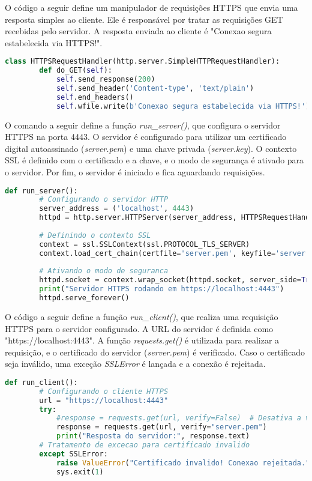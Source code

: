 \documentclass[a4paper,12pt]{article}
\begin{document}
O código a seguir define um manipulador de requisições HTTPS que envia uma resposta simples ao cliente. Ele é responsável por tratar as requisições GET recebidas pelo servidor. A resposta enviada ao cliente é "Conexao segura estabelecida via HTTPS!". 
\begin{lstlisting}[language=Python]
    class HTTPSRequestHandler(http.server.SimpleHTTPRequestHandler):
        def do_GET(self):
            self.send_response(200)
            self.send_header('Content-type', 'text/plain')
            self.end_headers()
            self.wfile.write(b'Conexao segura estabelecida via HTTPS!')
\end{lstlisting}

O comando a seguir define a função \textit{run\_server()}, que configura o servidor HTTPS na porta 4443. O servidor é configurado para utilizar um certificado digital autoassinado (\textit{server.pem}) e uma chave privada (\textit{server.key}). O contexto SSL é definido com o certificado e a chave, e o modo de segurança é ativado para o servidor. Por fim, o servidor é iniciado e fica aguardando requisições.
\begin{lstlisting}[language=Python]
    def run_server():
        # Configurando o servidor HTTP
        server_address = ('localhost', 4443)
        httpd = http.server.HTTPServer(server_address, HTTPSRequestHandler)
        
        # Definindo o contexto SSL
        context = ssl.SSLContext(ssl.PROTOCOL_TLS_SERVER)
        context.load_cert_chain(certfile='server.pem', keyfile='server.key')
    
        # Ativando o modo de seguranca
        httpd.socket = context.wrap_socket(httpd.socket, server_side=True)
        print("Servidor HTTPS rodando em https://localhost:4443")
        httpd.serve_forever()
\end{lstlisting}

O código a seguir define a função \textit{run\_client()}, que realiza uma requisição HTTPS para o servidor configurado. A URL do servidor é definida como "https://localhost:4443". A função \textit{requests.get()} é utilizada para realizar a requisição, e o certificado do servidor (\textit{server.pem}) é verificado. Caso o certificado seja inválido, uma exceção \textit{SSLError} é lançada e a conexão é rejeitada.
\begin{lstlisting}[language=Python]
    def run_client():
        # Configurando o cliente HTTPS
        url = "https://localhost:4443"
        try:
            #response = requests.get(url, verify=False)  # Desativa a verificacao SSL (somente para testes!)
            response = requests.get(url, verify="server.pem")
            print("Resposta do servidor:", response.text)
        # Tratamento de excecao para certificado invalido
        except SSLError:
            raise ValueError("Certificado invalido! Conexao rejeitada.")
            sys.exit(1)
\end{lstlisting}
\end{document}
